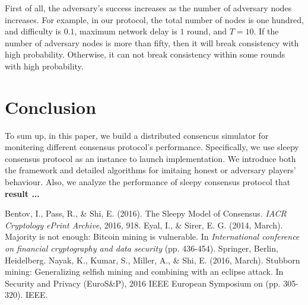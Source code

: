 \documentclass{llncs}
\begin{document}
First of all, the adversary's success increases as the number of adversary nodes increases. For example, in our protocol, the total number of nodes is one hundred, and difficulty is $0.1$, maximum network delay is $1$ round, and $T = 10$. If the number of adversary nodes is more than fifty, then it will break consistency with high probability. Otherwise, it can not break consistency within some rounds with high probability.\\
\section{Conclusion}
\quad To sum up, in this paper, we build a distributed consencus simulator for monitering different consensus protocol's performance. Specifically, we use sleepy consensus protocol as an instance to launch implementation. We introduce both the framework and detailed algorithms for imitaing honest or adversary players' behaviour. Also, we analyze the performance of sleepy consensus protocol that \textbf{result ...}


\begin{thebibliography}{}  %

Bentov, I., Pass, R., \& Shi, E. (2016). The Sleepy Model of Consensus. \emph{IACR Cryptology ePrint Archive}, 2016, 918.
Eyal, I., \& Sirer, E. G. (2014, March). Majority is not enough: Bitcoin mining is vulnerable. In \emph{International conference on financial cryptography and data security} (pp. 436-454). Springer, Berlin, Heidelberg.
Nayak, K., Kumar, S., Miller, A., \& Shi, E. (2016, March). Stubborn mining: Generalizing selfish mining and combining with an eclipse attack. In Security and Privacy (EuroS\&P), 2016 IEEE European Symposium on (pp. 305-320). IEEE.
\end{thebibliography}
%
\end{document}
